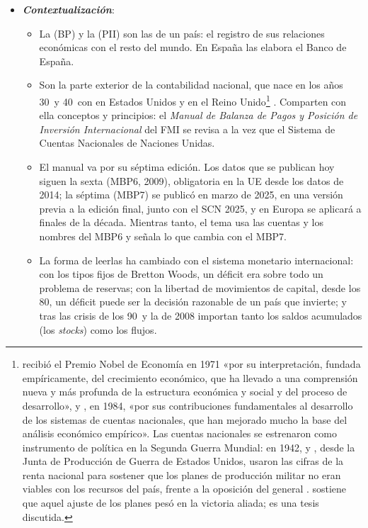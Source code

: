 \documentclass[11pt]{article}
\begin{document}
\begin{itemize}
\item \textbf{\emph{Contextualización}}:
  \begin{itemize}
  \item La  (BP) y la  (PII) son las  de un país: el registro de sus relaciones económicas con el resto del mundo. En España las elabora el Banco de España.
  \item Son la parte exterior de la contabilidad nacional, que nace en los años 30~y 40~con  en Estados Unidos y  en el Reino Unido\footnote{ recibió el Premio Nobel de Economía en 1971 «por su interpretación, fundada empíricamente, del crecimiento económico, que ha llevado a una comprensión nueva y más profunda de la estructura económica y social y del proceso de desarrollo»\nocite{Nobel1971Kuznets}, y , en 1984, «por sus contribuciones fundamentales al desarrollo de los sistemas de cuentas nacionales, que han mejorado mucho la base del análisis económico empírico»\nocite{Nobel1984Stone}. Las cuentas nacionales se estrenaron como instrumento de política en la Segunda Guerra Mundial: en 1942,  y , desde la Junta de Producción de Guerra de Estados Unidos, usaron las cifras de la renta nacional para sostener que los planes de producción militar no eran viables con los recursos del país, frente a la oposición del general . \textcite{Lacey2011} sostiene que aquel ajuste de los planes pesó en la victoria aliada; es una tesis discutida.} . Comparten con ella conceptos y principios: el \emph{Manual de Balanza de Pagos y Posición de Inversión Internacional} del FMI se revisa a la vez que el Sistema de Cuentas Nacionales de Naciones Unidas.
  \item El manual va por su séptima edición. Los datos que se publican hoy siguen la sexta (MBP6, 2009), obligatoria en la UE desde los datos de 2014; la séptima (MBP7) se publicó en marzo de 2025, en una versión previa a la edición final, junto con el SCN 2025, y en Europa se aplicará a finales de la década\nocite{FMI2009MBP6,FMI2025MBP7,FMI2025BPM7,BCE2026CalidadBP}. Mientras tanto, el tema usa las cuentas y los nombres del MBP6 y señala lo que cambia con el MBP7.
  \item La forma de leerlas ha cambiado con el sistema monetario internacional: con los tipos fijos de Bretton Woods, un déficit era sobre todo un problema de reservas; con la libertad de movimientos de capital, desde los 80, un déficit puede ser la decisión razonable de un país que invierte; y tras las crisis de los 90~y la de 2008 importan tanto los saldos acumulados (los \emph{stocks}) como los flujos.
  \end{itemize}


\end{itemize}
\end{document}
